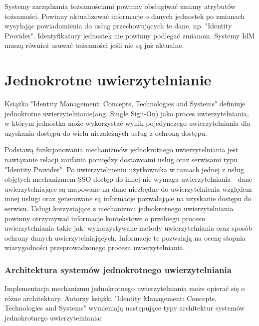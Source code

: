 Systemy zarządzania tożsamościami powinny obsługiwać zmiany atrybutów tożsamości. Powinny aktualizować informacje o danych jednostek po zmianach wysyłając powiadomienia do usług przechowujących te dane, np. "Identity Provider". Identyfikatory jednostek nie powinny podlegać zmianom. Systemy IdM muszą również usuwać tożsamości jeśli nie są już aktualne.

\section{Jednokrotne uwierzytelnianie}

Książka "Identity Management: Concepts, Technologies and Systems" definiuje jednokrotne uwierzytelnianie(ang. Single Sign-On) jako proces uwierzytelniania, w którym jednostka może wykorzystać wynik pojedynczego uwierzytelniania dla uzyskania dostępu do wielu niezależnych usług z ochroną dostępu\cite{Bertino11}. 

Podstawą funkcjonowania mechanizmów jednokrotnego uwierzytelniania jest nawiązanie relacji zaufania pomiędzy dostawcami usług oraz serwisami typu "Identity Provider". Po uwierzytelnieniu użytkownika w ramach jednej z usług objętych mechanizmem SSO dostęp do innej nie wymaga uwierzytelniania - dane uwierzytelniające są mapowane na dane niezbędne do uwierzytelnienia względem innej usługi oraz generowane są informacje pozwalające na uzyskanie dostępu do serwisu. Usługi korzystające z mechanizmu jednokrotnego uwierzytelniania powinny otrzymywać informacje kontekstowe o przebiegu procesu uwierzytelniania takie jak: wykorzystywane metody uwierzytelniania oraz sposób ochrony danych uwierzytelniających. Informacje te pozwalają na ocenę stopnia wiarygodności przeprowadzonego procesu uwierzytelniania.

\subsubsection{Architektura systemów jednokrotnego uwierzytelniania}

Implementacja mechanizmu jednokrotnego uwierzytelniania może opierać się o różne architektury. Autorzy książki "Identity Management: Concepts, Technologies and Systems"\cite{Bertino11} wymieniają następujące typy architektur systemów jednokrotnego uwierzytelniania:

